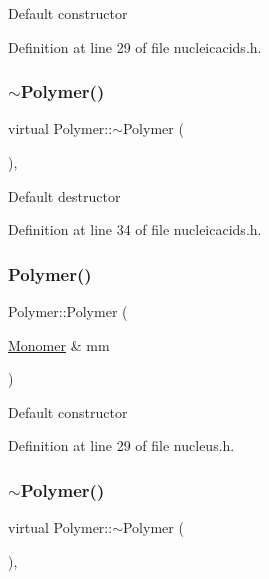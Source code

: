 Default constructor 

Definition at line 29 of file nucleicacids.\+h.

\mbox{\label{class_polymer_aac2b3983f375a5691c7d5ca1a79594d5}} 
\subsubsection{\texorpdfstring{$\sim$\+Polymer()}{~Polymer()}\hspace{0.1cm}{\footnotesize\ttfamily [8/11]}}
{\footnotesize\ttfamily virtual Polymer\+::$\sim$\+Polymer (\begin{DoxyParamCaption}{ }\end{DoxyParamCaption})\hspace{0.3cm}{\ttfamily [inline]}, {\ttfamily [virtual]}}

Default destructor 

Definition at line 34 of file nucleicacids.\+h.

\mbox{\label{class_polymer_ae77454a3908652e4df6a26b9cac509a5}} 
\subsubsection{\texorpdfstring{Polymer()}{Polymer()}\hspace{0.1cm}{\footnotesize\ttfamily [9/14]}}
{\footnotesize\ttfamily Polymer\+::\+Polymer (\begin{DoxyParamCaption}\item[{\mbox{\hyperlink{class_monomer}{Monomer}} \&}]{mm }\end{DoxyParamCaption})\hspace{0.3cm}{\ttfamily [inline]}}

Default constructor 

Definition at line 29 of file nucleus.\+h.

\mbox{\label{class_polymer_aac2b3983f375a5691c7d5ca1a79594d5}} 
\subsubsection{\texorpdfstring{$\sim$\+Polymer()}{~Polymer()}\hspace{0.1cm}{\footnotesize\ttfamily [9/11]}}
{\footnotesize\ttfamily virtual Polymer\+::$\sim$\+Polymer (\begin{DoxyParamCaption}{ }\end{DoxyParamCaption})\hspace{0.3cm}{\ttfamily [inline]}, {\ttfamily [virtual]}}

